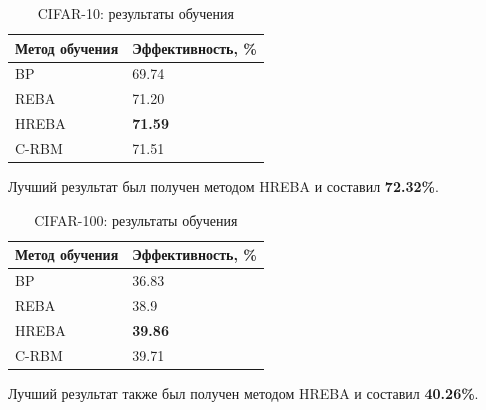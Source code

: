 \begin{table} [h!]
  \centering
  \caption{CIFAR-10: результаты обучения}\label{table:cifar_10_results}
  \begin{tabular}{| p{6cm} | p{6cm} |}
    \hline
      \textbf{Метод обучения} & \textbf{Эффективность, \%}\\
      \hline
      BP & 69.74\\
      \hline
      REBA & 71.20\\
      \hline
      HREBA & \textbf{71.59}\\
      \hline
      C-RBM & 71.51\\
      \hline
  \end{tabular}
\end{table}

Лучший результат был получен методом HREBA и составил \textbf{72.32\%}.

\begin{table} [H]
  \centering
  \caption{CIFAR-100: результаты обучения}\label{table:cifar_100_results}
  \begin{tabular}{| p{6cm} | p{6cm} |}
    \hline
      \textbf{Метод обучения} & \textbf{Эффективность, \%}\\
      \hline
      BP & 36.83\\
      \hline
      REBA & 38.9\\
      \hline
      HREBA & \textbf{39.86}\\
      \hline
      C-RBM & 39.71\\
      \hline
  \end{tabular}
\end{table}

Лучший результат также был получен методом HREBA и составил \textbf{40.26\%}.




